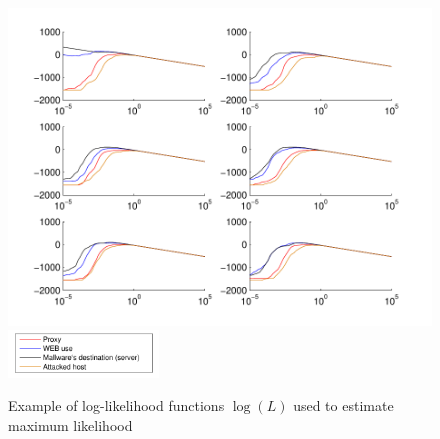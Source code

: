 \documentclass[a4paper,journal]{IEEEtran}
\begin{document}
\begin{figure}[h!]%
  \centering
  \includegraphics[width=140mm]{loglik_src_bdivp}
  \includegraphics[width=40mm]{legend}
  \caption{Example of log-likelihood functions $\log(L)$ used to estimate maximum likelihood}
  \label{fig:loglik_src_bdivp}
\end{figure}



\end{document}
